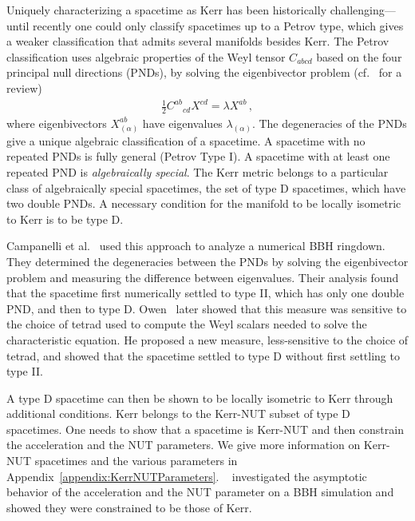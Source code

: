 Uniquely characterizing a spacetime as Kerr has been historically challenging---until recently one could only classify spacetimes up to a Petrov type, which gives a weaker classification that admits several manifolds besides Kerr. The Petrov classification uses algebraic properties of the Weyl tensor $C_{abcd}$ based on the four principal null directions (PNDs), by solving the eigenbivector problem (cf.~\cite{stephani2009exact} for a review)
\begin{align}
\label{eq:eigenvalue}
\frac{1}{2} C^{ab}{}_{cd} X^{cd} = \lambda X^{ab}\,,
\end{align}
where eigenbivectors $X^{ab}_{(\alpha)}$ have eigenvalues $\lambda_{(\alpha)}$. The degeneracies of the PNDs give a unique algebraic classification of a spacetime. A spacetime with no repeated PNDs is fully general (Petrov Type I). A spacetime with at least one repeated PND is \textit{algebraically special}. The Kerr metric belongs to a particular class of algebraically special spacetimes, the set of type D spacetimes, which have two double PNDs. A necessary condition for the manifold to be locally isometric to Kerr is to be type D.

Campanelli et al.~\cite{Campanelli:2008dv} used this approach to analyze a numerical BBH ringdown. They determined the degeneracies between the PNDs by solving the eigenbivector problem and measuring the difference between eigenvalues. Their analysis found that the spacetime first numerically settled to type II, which has only one double PND, and then to type D. Owen~\cite{Owen:2010vw} later showed that this measure was sensitive to the choice of tetrad used to compute the Weyl scalars needed to solve the characteristic equation. He proposed a new measure, less-sensitive to the choice of tetrad, and showed that the spacetime settled to type D without first settling to type II.

A type D spacetime can then be shown to be locally isometric to Kerr through additional conditions. Kerr belongs to the Kerr-NUT subset of type D spacetimes. One needs to show that a spacetime is Kerr-NUT and then constrain the acceleration and the NUT parameters. We give more information on Kerr-NUT spacetimes and the various parameters in Appendix~\ref{appendix:KerrNUTParameters}. ~\cite{Campanelli:2008dv} investigated the asymptotic behavior of the acceleration and the NUT parameter on a BBH simulation and showed they were constrained to be those of Kerr. %

